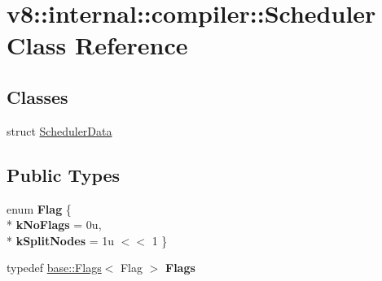 \hypertarget{classv8_1_1internal_1_1compiler_1_1_scheduler}{}\section{v8\+:\+:internal\+:\+:compiler\+:\+:Scheduler Class Reference}
\label{classv8_1_1internal_1_1compiler_1_1_scheduler}
\subsection*{Classes}
\begin{DoxyCompactItemize}
\item 
struct \hyperlink{structv8_1_1internal_1_1compiler_1_1_scheduler_1_1_scheduler_data}{Scheduler\+Data}
\end{DoxyCompactItemize}
\subsection*{Public Types}
\begin{DoxyCompactItemize}
\item 
enum {\bfseries Flag} \{ \\*
{\bfseries k\+No\+Flags} = 0u, 
\\*
{\bfseries k\+Split\+Nodes} = 1u $<$$<$ 1
 \}\hypertarget{classv8_1_1internal_1_1compiler_1_1_scheduler_a7b78d98e449aadb3548a311754b624d5}{}\label{classv8_1_1internal_1_1compiler_1_1_scheduler_a7b78d98e449aadb3548a311754b624d5}

\item 
typedef \hyperlink{classv8_1_1base_1_1_flags}{base\+::\+Flags}$<$ Flag $>$ {\bfseries Flags}\hypertarget{classv8_1_1internal_1_1compiler_1_1_scheduler_a11c3273ecfdea86e069c3de0021859b5}{}\label{classv8_1_1internal_1_1compiler_1_1_scheduler_a11c3273ecfdea86e069c3de0021859b5}

\end{DoxyCompactItemize}
